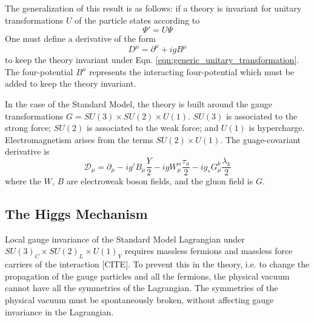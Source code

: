 \documentclass{article}
\begin{document}
The generalization of this result is as follows: if a theory is invariant for unitary transformations $U$ of the particle states according to 
\begin{equation}
    \Psi' = U\Psi
\label{eqn:generic_unitary_transformation}
\end{equation}
One must define a derivative of the form
\begin{equation}
    D^\mu = \partial^\mu + ig B^\mu
\end{equation}
to keep the theory invariant under Eqn. \ref{eqn:generic_unitary_transformation}. The four-potential $B^\mu$ represents the interacting four-potential which must be added to keep the theory invariant.

In the case of the Standard Model, the theory is built around the gauge transformations $G = SU(3) \times SU(2) \times U(1)$. $SU(3)$ is associated to the strong force; $SU(2)$ is associated to the weak force; and $U(1)$ is hypercharge. Electromagnetism arises from the terms $SU(2) \times U(1)$. The guage-covariant derivative is 
\begin{equation}
    \mathcal{D}_\mu = \partial_\mu - ig' B_\mu \frac{Y}{2} - ig W_{\mu}^{\alpha} \frac{\tau_a}{2} - ig_s G_\mu^{k} \frac{\lambda_k}{2}
\end{equation}
where the $W$, $B$ are electroweak boson fields, and the gluon field is $G$.

\subsection{The Higgs Mechanism}
Local gauge invariance of the Standard Model Lagrangian under $SU(3)_C \times SU(2)_L \times U(1)_Y$ requires massless fermions and massless force carriers of the interaction [CITE]. To prevent this in the theory, i.e. to change the propagation of the gauge particles and all the fermions, the physical vacuum cannot have all the symmetries of the Lagrangian. The symmetries of the physical vacuum must be spontaneously broken, without affecting gauge invariance in the Lagrangian. 
\end{document}
